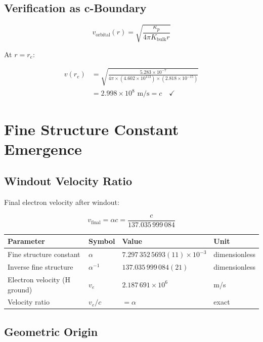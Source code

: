 \documentclass{article}
\begin{document}
\subsection{Verification as c-Boundary}

\begin{equation}
v_{\text{orbital}}(r) = \sqrt{\frac{\kappa_p}{4\pi K_{\text{bulk}} r}}
\end{equation}

At $r = r_e$:

\begin{align}
v(r_e) &= \sqrt{\frac{5.283 \times 10^{-7}}{4\pi \times (4.602 \times 10^{113}) \times (2.818 \times 10^{-15})}} \\
&= 2.998 \times 10^8 \text{ m/s} = c \quad \checkmark
\end{align}

\section{Fine Structure Constant Emergence}

\subsection{Windout Velocity Ratio}

Final electron velocity after windout:

\begin{equation}
v_{\text{final}} = \alpha c = \frac{c}{137.035\,999\,084}
\end{equation}

\begin{longtable}{llll}
\toprule
\textbf{Parameter} & \textbf{Symbol} & \textbf{Value} & \textbf{Unit} \\
\midrule
Fine structure constant & $\alpha$ & $7.297\,352\,5693(11) \times 10^{-3}$ & dimensionless \\
Inverse fine structure & $\alpha^{-1}$ & $137.035\,999\,084(21)$ & dimensionless \\
Electron velocity (H ground) & $v_e$ & $2.187\,691\times 10^6$ & m/s \\
Velocity ratio & $v_e/c$ & $= \alpha$ & exact \\
\bottomrule
\end{longtable}

\subsection{Geometric Origin}
\end{document}
